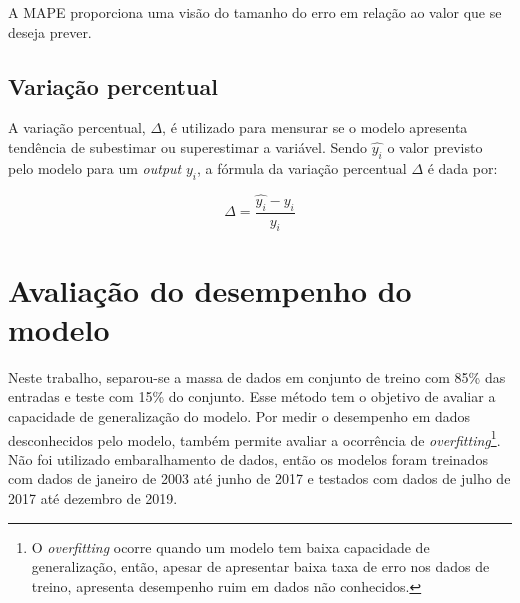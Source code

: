 A MAPE proporciona uma visão do tamanho do erro em relação ao valor que se 
deseja prever.

\subsection{Variação percentual}

A variação percentual, $\Delta$, é utilizado para mensurar se o 
modelo apresenta tendência de subestimar ou superestimar a variável. 
Sendo $\hat{y_i}$ o valor previsto pelo 
modelo para um \textit{output} $y_i$, a fórmula da variação percentual
$\Delta$ é dada por:

\begin{equation}
    \Delta = \frac{\hat{y_i} - y_i}{y_i}
\end{equation}

\section{Avaliação do desempenho do modelo}

Neste trabalho, separou-se a massa de dados em conjunto de treino com 85\% 
das entradas e teste com 15\% do conjunto. Esse método tem o objetivo de avaliar
a capacidade de generalização do modelo. Por medir o desempenho em dados 
desconhecidos pelo modelo, também permite avaliar a ocorrência de \textit{overfitting}\footnote{
O \textit{overfitting} ocorre quando um modelo tem baixa capacidade de generalização, 
então, apesar de apresentar baixa taxa de erro nos dados de treino, apresenta 
desempenho ruim em dados não conhecidos.}. Não foi utilizado embaralhamento de dados, 
então os modelos foram treinados com dados de janeiro de 2003 até junho de 2017
e testados com dados de julho de 2017 até dezembro de 2019.

